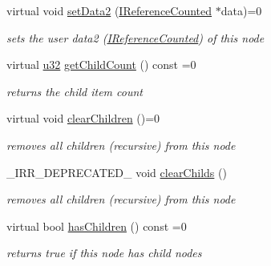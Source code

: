 \begin{DoxyCompactItemize}
\mbox{\label{classirr_1_1gui_1_1IGUITreeViewNode_aa837350d9f71ca6b3dae25678f17bd21}} 
virtual void \hyperlink{classirr_1_1gui_1_1IGUITreeViewNode_aa837350d9f71ca6b3dae25678f17bd21}{set\+Data2} (\hyperlink{classirr_1_1IReferenceCounted}{I\+Reference\+Counted} $\ast$data)=0
\begin{DoxyCompactList}\small\item\em sets the user data2 (\hyperlink{classirr_1_1IReferenceCounted}{I\+Reference\+Counted}) of this node \end{DoxyCompactList}\item 
\mbox{\label{classirr_1_1gui_1_1IGUITreeViewNode_a8b9aeb50e43a76b27187aa5c0d370f23}} 
virtual \hyperlink{namespaceirr_a0416a53257075833e7002efd0a18e804}{u32} \hyperlink{classirr_1_1gui_1_1IGUITreeViewNode_a8b9aeb50e43a76b27187aa5c0d370f23}{get\+Child\+Count} () const =0
\begin{DoxyCompactList}\small\item\em returns the child item count \end{DoxyCompactList}\item 
\mbox{\label{classirr_1_1gui_1_1IGUITreeViewNode_a0bc4702930d1ddb25b895c7176f5f459}} 
virtual void \hyperlink{classirr_1_1gui_1_1IGUITreeViewNode_a0bc4702930d1ddb25b895c7176f5f459}{clear\+Children} ()=0
\begin{DoxyCompactList}\small\item\em removes all children (recursive) from this node \end{DoxyCompactList}\item 
\+\_\+\+I\+R\+R\+\_\+\+D\+E\+P\+R\+E\+C\+A\+T\+E\+D\+\_\+ void \hyperlink{classirr_1_1gui_1_1IGUITreeViewNode_a6c431404c8e36eb565f033c1e1dce247}{clear\+Childs} ()
\begin{DoxyCompactList}\small\item\em removes all children (recursive) from this node \end{DoxyCompactList}\item 
\mbox{\label{classirr_1_1gui_1_1IGUITreeViewNode_a64244b92443fefbd06c910daf5db3c5f}} 
virtual bool \hyperlink{classirr_1_1gui_1_1IGUITreeViewNode_a64244b92443fefbd06c910daf5db3c5f}{has\+Children} () const =0
\begin{DoxyCompactList}\small\item\em returns true if this node has child nodes \end{DoxyCompactList}\item 

\end{DoxyCompactItemize}
